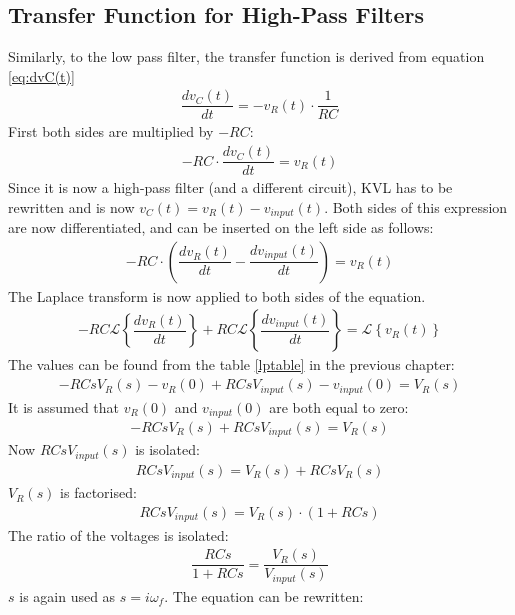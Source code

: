 \subsection{Transfer Function for High-Pass Filters}
Similarly, to the low pass filter, the transfer function is derived from equation \eqref{eq:dvC(t)} 
\begin{align}
\dfrac{dv_{C}(t)}{dt} = -v_{R}(t) \cdot \dfrac{1}{RC}
\end{align}
First both sides are multiplied by $-RC$:
\begin{align}
-RC \cdot \dfrac{dv_{C}(t)}{dt} = v_{R}(t)
\end{align}
Since it is now a high-pass filter (and a different circuit), KVL has to be rewritten and is now $v_{C}(t)=v_{R}(t)-v_{input}(t)$. Both sides of this expression are now differentiated, and can be inserted on the left side as follows:
\begin{align*}
-RC \cdot \left(\dfrac{dv_{R}(t)}{dt} - \dfrac{dv_{input}(t)}{dt} \right) = v_{R}(t)
\end{align*}
The Laplace transform is now applied to both sides of the equation.
\begin{align*}
-RC \mathcal{L} \left\{\dfrac{dv_{R}(t)}{dt} \right\} + RC \mathcal{L} \left\{ \dfrac{dv_{input}(t)}{dt} \right\} = \mathcal{L} \left\{v_{R}(t) \right\}
\end{align*}
The values can be found from the table \ref{lptable} in the previous chapter:
\begin{align*}
-RCsV_{R}(s)-v_{R}(0) + RCsV_{input}(s)-v_{input}(0) = V_{R}(s)
\end{align*}
It is assumed that $v_{R}(0)$ and $v_{input}(0)$ are both equal to zero:
\begin{align*}
-RCsV_{R}(s) + RCsV_{input}(s) = V_{R}(s)
\end{align*}
Now $RCs V_{input}(s)$ is isolated:
\begin{align*}
RCsV_{input}(s) = V_{R}(s) + RCsV_{R}(s)
\end{align*}
$V_{R}(s)$ is factorised:
\begin{align*}
RCsV_{input}(s) = V_{R}(s) \cdot (1 + RCs)
\end{align*}
The ratio of the voltages is isolated:
\begin{align} \label{hp:visolated}
\dfrac{RCs}{1 + RCs} = \dfrac{V_{R}(s)}{V_{input}(s)}
\end{align}
$s$ is again used as $s=i\omega_f$. The equation can be rewritten:
